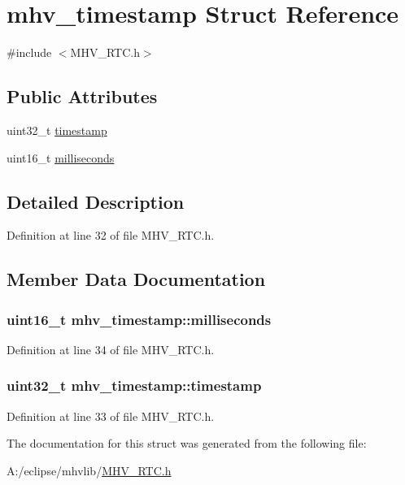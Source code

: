 \hypertarget{structmhv__timestamp}{
\section{mhv\-\_\-timestamp \-Struct \-Reference}
\label{structmhv__timestamp}
}


{\ttfamily \#include $<$\-M\-H\-V\-\_\-\-R\-T\-C.\-h$>$}

\subsection*{\-Public \-Attributes}
\begin{DoxyCompactItemize}
\item 
uint32\-\_\-t \hyperlink{structmhv__timestamp_a0f520358e057865fb12a9153cae820c5}{timestamp}
\item 
uint16\-\_\-t \hyperlink{structmhv__timestamp_a8285e4adf91b7ddbec8ab65b5ab855e1}{milliseconds}
\end{DoxyCompactItemize}


\subsection{\-Detailed \-Description}


\-Definition at line 32 of file \-M\-H\-V\-\_\-\-R\-T\-C.\-h.



\subsection{\-Member \-Data \-Documentation}
\hypertarget{structmhv__timestamp_a8285e4adf91b7ddbec8ab65b5ab855e1}{
\subsubsection[{milliseconds}]{\setlength{\rightskip}{0pt plus 5cm}uint16\-\_\-t {\bf mhv\-\_\-timestamp\-::milliseconds}}}
\label{structmhv__timestamp_a8285e4adf91b7ddbec8ab65b5ab855e1}


\-Definition at line 34 of file \-M\-H\-V\-\_\-\-R\-T\-C.\-h.

\hypertarget{structmhv__timestamp_a0f520358e057865fb12a9153cae820c5}{
\subsubsection[{timestamp}]{\setlength{\rightskip}{0pt plus 5cm}uint32\-\_\-t {\bf mhv\-\_\-timestamp\-::timestamp}}}
\label{structmhv__timestamp_a0f520358e057865fb12a9153cae820c5}


\-Definition at line 33 of file \-M\-H\-V\-\_\-\-R\-T\-C.\-h.



\-The documentation for this struct was generated from the following file\-:\begin{DoxyCompactItemize}
\item 
\-A\-:/eclipse/mhvlib/\hyperlink{_m_h_v___r_t_c_8h}{\-M\-H\-V\-\_\-\-R\-T\-C.\-h}\end{DoxyCompactItemize}
